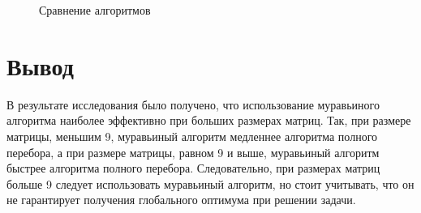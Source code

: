 \begin{figure}[ht!]
	\begin{center}
		\captionsetup{singlelinecheck = false, justification=centerfirst}
		\centering
		\caption{Сравнение алгоритмов}
		\label{fig:graph1}
	\end{center}
\end{figure}
\clearpage

\section*{Вывод}

В результате исследования было получено, что использование муравьиного алгоритма наиболее эффективно при больших размерах матриц. Так, при размере матрицы, меньшим 9, муравьиный алгоритм медленнее алгоритма полного перебора, а при размере матрицы, равном 9 и  выше, муравьиный алгоритм быстрее алгоритма полного перебора. 
Следовательно, при размерах матриц больше 9 следует использовать муравьиный алгоритм, но стоит учитывать, что он не гарантирует получения глобального оптимума при решении задачи.

